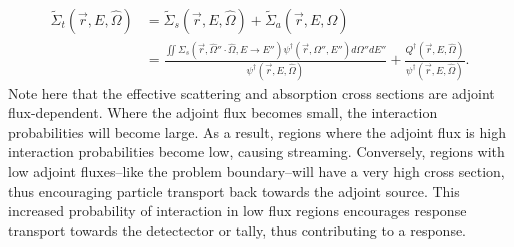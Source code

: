 \begin{equation}
\begin{aligned}
\widetilde{\Sigma}_{t}(\vec{r}, E, \hat\Omega) &=
        \widetilde{\Sigma}_{s}(\vec{r}, E, \hat\Omega) +
        \widetilde{\Sigma}_{a}(\vec{r}, E, \hat\Omega)    \\
     &= \frac{\iint \Sigma_{s}(\vec{r},\hat\Omega''\cdot\hat\Omega,
         E\rightarrow E'') \psi^{\dagger}
         (\vec{r}, \Omega'', E'') d\Omega'' dE''}
         {\psi^{\dagger}(\vec{r}, E, \hat\Omega)}
        + \frac{Q^{\dagger}(\vec{r}, E, \hat\Omega)}
        {\psi^{\dagger}(\vec{r}, E, \hat\Omega)}.
\end{aligned}
\end{equation}
Note here that the effective scattering and absorption cross sections are
adjoint flux-dependent. Where the adjoint flux becomes small, the interaction
probabilities will become large. As a result, regions where the adjoint flux
is high interaction probabilities become low, causing streaming. Conversely, regions with low adjoint
fluxes--like the problem boundary--will have a very high cross section, thus
encouraging particle transport back towards the adjoint source. This
increased probability of interaction in low flux regions encourages response
transport towards the detectector or tally, thus contributing to a response.

